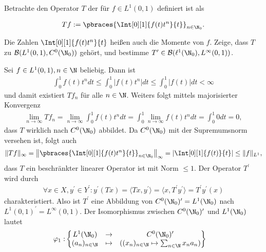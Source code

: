 \begin{exercise}[18/1]

Betrachte den Operator $T$ der für $f \in L^1(0, 1)$ definiert ist als

\begin{align*}
  T f
  :=
  \pbraces{\Int[0][1]{f(t) t^n}{t}}_{n \in \N_0}.
\end{align*}

Die Zahlen $\Int[0][1]{f(t) t^n}{t}$ heißen auch die Momente von $f$.
Zeige, dass $T$ zu $\mathcal{B}(L^1(0, 1), C^0(\N_0))$ gehört, und bestimme $T^\prime \in \mathcal{B}(\ell^1(\N_0), L^\infty(0, 1))$.

\end{exercise}

\begin{solution}
Sei $f \in L^1(0,1), n \in \N$ beliebig. Dann ist
\begin{align*}
  \int_0^1 f(t)t^n dt \leq   \int_0^1|f(t)t^n|dt \leq \int_0^1 |f(t)| dt < \infty
\end{align*}
und damit existiert $Tf_n$ für alle $n \in \N$. Weiters folgt mittels majorisierter
Konvergenz
\begin{align*}
  \lim_{n \to \infty} Tf_n = \lim_{n \to \infty} \int_0^1 f(t)t^n dt
  =  \int_0^1 \lim_{n \to \infty}f(t)t^n dt = \int_0^1 0 dt= 0,
\end{align*}
dass $T$ wirklich nach $C^0(\N_0)$ abbildet. Da $C^0(\N_0)$ mit der Supremumsnorm
versehen ist, folgt auch
\begin{align*}
  \|Tf\|_{\infty} = \left\|\pbraces{\Int[0][1]{f(t) t^n}{t}}_{n \in \N_0}\right\|_{\infty} =
  \left|\Int[0][1]{f(t)}{t}\right| \leq \|f\|_{L^1},
\end{align*}
dass $T$ ein beschränkter linearer Operator ist mit Norm $\leq 1$.
Der Operator $T^{\prime}$ wird durch
\begin{align*}
  \forall x \in X, y^{\prime} \in Y^{\prime}:
  y^{\prime}(Tx) = \langle Tx,y^{\prime} \rangle =
  \langle x, T^{\prime}y^{\prime}\rangle = T^{\prime}y^{\prime}(x)
\end{align*}
charakteristiert. Also ist $T^{\prime}$ eine Abbildung von $C^0(\N_0)^{\prime} = L^1(\N_0)$
nach $L^1(0, 1)^{\prime} = L^\infty(0, 1)$.
Der Isomorphismus zwischen $C^0(\N_0)^{\prime}$ und $L^1(\N_0)$ lautet
\begin{align*}
  \varphi_1:& \begin{Bmatrix}
    L^1(\N_0) & \to & C^0(\N_0)^{\prime} \\
    (a_n)_{n \in \N} &\mapsto & ((x_n)_{n \in \N} \mapsto \sum_{n \in \N}x_na_n)

\end{Bmatrix}
\end{align*}
\end{solution}
